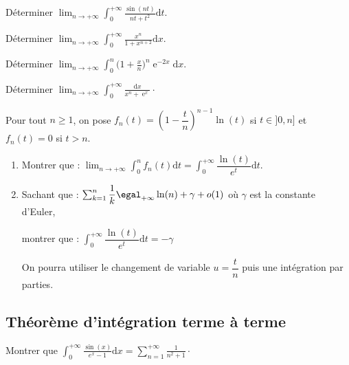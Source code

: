 \documentclass[a4paper,twoside,french,11pt]{VcCours}
\newcommand{\dx}{\text{d}x}
\newcommand{\dt}{\text{d}t}
\DeclareMathOperator{\e}{e}
\begin{document}
\begin{multicols}{2}
\begin{Exercice}{} Déterminer $\lim_{n \to + \infty} \int_{0}^{ + \infty} \frac{\sin(nt)}{nt + t^{2}} \dt$.
\end{Exercice}

\begin{Exercice}{} Déterminer $\lim_{n \rightarrow + \infty}\int_{0}^{ + \infty} \frac{x^{n}}{1 + x^{n + 2}} \dx$.
\end{Exercice}

\begin{Exercice}{} Déterminer $\lim_{n \to + \infty} \int_{0}^{n} \biggl( 1 + \frac{x}{n} \biggr)^{\!\!n} \e^{ - 2x} \dx$.
\end{Exercice}

\begin{Exercice}{} Déterminer $\lim_{n \rightarrow + \infty} \int_{0}^{ + \infty} \frac{\dx}{x^{n} + \e^{x}} \cdot$
\end{Exercice}
\end{multicols}
 
\begin{Exercice}{}
Pour tout $n \geq 1$, on pose $f_n(t) = \left( 1 - \dfrac{t}{n} \right)^{n-1}\ln(t)$ si $t \in ]0,n]$ et $f_n(t)=0$ si $t>n$.
\begin{enumerate}
\item Montrer que : $\lim_{n \rightarrow + \infty} \int_{0}^n f_n(t) \dt = \int_{0}^{+ \infty} \dfrac{\ln(t)}{e^t} \dt$.
\item Sachant que : $\sum_{k=1}^n \dfrac{1}{k} \egal_{+\infty} \ln(n)+ \gamma + o(1)$
où $\gamma$ est la constante d'Euler,

montrer que : $\int_{0}^{+ \infty} \dfrac{\ln(t)}{e^t} \dt = - \gamma$

On pourra utiliser le changement de variable $u=\dfrac{t}{n}$ puis une intégration par parties.
\end{enumerate}
\end{Exercice}

\subsection{Théorème d'intégration terme à terme}

\begin{Exercice}{} Montrer que $\int_{0}^{+ \infty} \frac{\sin(x)}{e^x-1} \dx = \sum_{n=1}^{+ \infty} \frac{1}{n^2+1}\cdot$
\end{Exercice}
\end{document}
